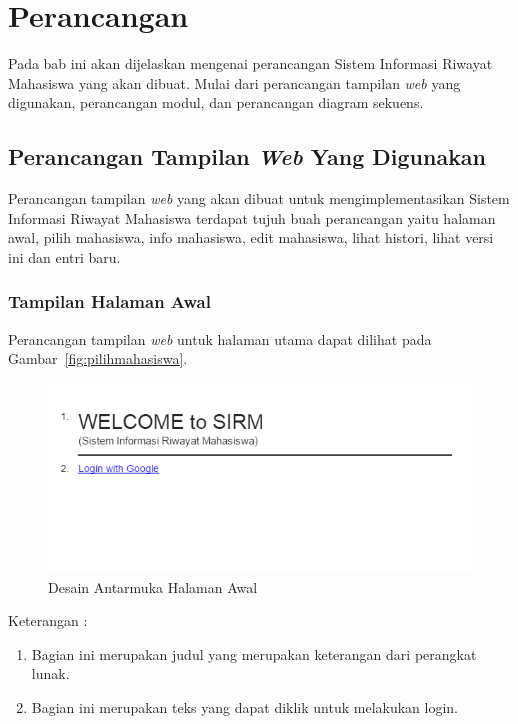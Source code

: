 \chapter{Perancangan}
\label{chap:perancangan}

Pada bab ini akan dijelaskan mengenai perancangan Sistem Informasi Riwayat
Mahasiswa yang akan dibuat. Mulai dari perancangan tampilan {\it web} yang digunakan,
perancangan modul, dan perancangan diagram sekuens.

\section{Perancangan Tampilan {\it Web} Yang Digunakan}
\label{sec:perancanganantarmuka}

Perancangan tampilan {\it web} yang akan dibuat untuk mengimplementasikan Sistem
Informasi Riwayat Mahasiswa terdapat tujuh buah perancangan yaitu halaman
awal, pilih mahasiswa, info mahasiswa, edit mahasiswa, lihat histori, lihat
versi ini dan entri baru.

\subsection{Tampilan Halaman Awal}
Perancangan tampilan {\it web} untuk halaman utama dapat dilihat pada
Gambar~\ref{fig:pilihmahasiswa}.

\begin{figure}[ht]
\centering
\includegraphics[scale=0.9]{Gambar/halamanawal.png}
\caption[Desain Antarmuka Halaman Awal]{Desain Antarmuka Halaman Awal}
\label{fig:halamanawal}
\end{figure}

Keterangan :
\begin{enumerate}[(1)]
\item
Bagian ini merupakan judul yang merupakan keterangan dari perangkat lunak.
\item
Bagian ini merupakan teks yang dapat diklik untuk melakukan login.
\end{enumerate}

